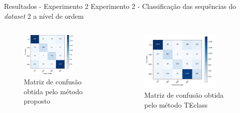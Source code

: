 \documentclass[%
  xcolor=table,%
  10pt,%
  aspectratio = 169,%
  compress,%
  t,%
]{beamer}%
\begin{document}
\begin{frame}{}{Resultados - Experimento 2}
    Experimento 2 - Classificação das sequências do \textit{dataset} 2 a nível de ordem
    \begin{columns}
        \begin{column}{0.5\textwidth}
            \begin{figure}[H]
                \centering
                \includegraphics[width=0.7\textwidth]{./Figuras/mc-o-teste9.png}
                \caption{Matriz de confusão obtida pelo método proposto}
                \label{fig:mc-o-teste2}
            \end{figure}       
        \end{column}
        \begin{column}{0.5\textwidth}  %
            \begin{figure}
                \centering
                \includegraphics[width=0.8\textwidth]{./Figuras/teclass-o-ds2.png}
                \caption{Matriz de confusão obtida pelo método TEclass}
                \label{fig:mc-o-teclass-ds2}
            \end{figure}
        \end{column}
    \end{columns}
\end{frame}
\end{document}
